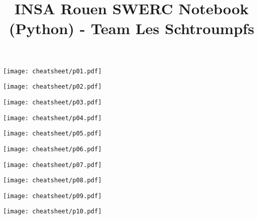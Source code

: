 \documentclass[10pt]{article}
\title{\vspace{-4ex}\Large{INSA Rouen SWERC Notebook (Python) - Team Les Schtroumpfs}}
\author{}
\date{}
\begin{document}
\begin{landscape}
\begin{multicols}{2}

\maketitle
\vspace{-13ex}
\tableofcontents
\pagestyle{fancy}



\end{multicols}
\end{landscape}

\centerline{\texttt{[image: cheatsheet/p01.pdf]}}
\centerline{\texttt{[image: cheatsheet/p02.pdf]}}
\centerline{\texttt{[image: cheatsheet/p03.pdf]}}
\centerline{\texttt{[image: cheatsheet/p04.pdf]}}
\centerline{\texttt{[image: cheatsheet/p05.pdf]}}
\centerline{\texttt{[image: cheatsheet/p06.pdf]}}
\centerline{\texttt{[image: cheatsheet/p07.pdf]}}
\centerline{\texttt{[image: cheatsheet/p08.pdf]}}
\centerline{\texttt{[image: cheatsheet/p09.pdf]}}
\centerline{\texttt{[image: cheatsheet/p10.pdf]}}

\newpage
\null
\newpage
\null
\newpage
\null
\end{document}

